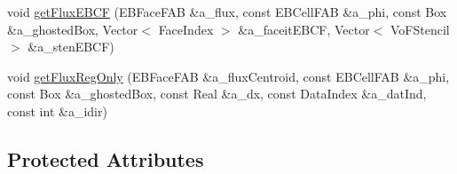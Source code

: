 \begin{DoxyCompactItemize}
\item 
void \hyperlink{classebconductivityop_aca229a6b51c7fd72967f78f1bb85248a}{get\+Flux\+E\+B\+CF} (E\+B\+Face\+F\+AB \&a\+\_\+flux, const E\+B\+Cell\+F\+AB \&a\+\_\+phi, const Box \&a\+\_\+ghosted\+Box, Vector$<$ Face\+Index $>$ \&a\+\_\+faceit\+E\+B\+CF, Vector$<$ Vo\+F\+Stencil $>$ \&a\+\_\+sten\+E\+B\+CF)
\item 
void \hyperlink{classebconductivityop_a866338fa1fc5ffe0ba842e5ae1d884cd}{get\+Flux\+Reg\+Only} (E\+B\+Face\+F\+AB \&a\+\_\+flux\+Centroid, const E\+B\+Cell\+F\+AB \&a\+\_\+phi, const Box \&a\+\_\+ghosted\+Box, const Real \&a\+\_\+dx, const Data\+Index \&a\+\_\+dat\+Ind, const int \&a\+\_\+idir)
\end{DoxyCompactItemize}
\subsection*{Protected Attributes}
